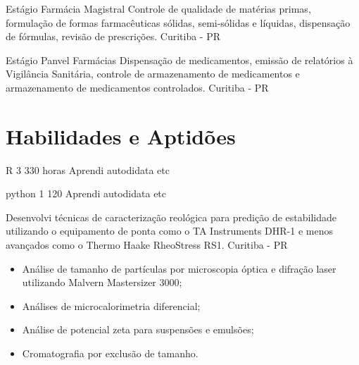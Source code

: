 {Estágio}
{Farmácia Magistral}
{
	Controle de qualidade de matérias primas, 
	formulação de formas farmacêuticas sólidas, 
	semi-sólidas e líquidas, dispensação de fórmulas, 
	revisão de prescrições.
}
{Curitiba - PR}

{Estágio}
{Panvel Farmácias}
{
	Dispensação de medicamentos, 
	emissão de relatórios à Vigilância Sanitária, 
	controle de armazenamento de medicamentos e 
	armazenamento de medicamentos controlados.
}
{Curitiba - PR}

\section{Habilidades e Aptidões}




\skill
{R}
{3}
{330 horas}
{Aprendi autodidata etc}
	
\skill
{python}
{1}
{120}
{Aprendi autodidata etc}
	




	{
	Desenvolvi técnicas de caracterização reológica para 
	predição de estabilidade utilizando o 
	equipamento de ponta como o TA Instruments DHR-1 e 
	menos avançados como o Thermo Haake RheoStress RS1.
	}{Curitiba - PR}







\renewcommand{\labelitemi}{\textendash}

{
	\begin{itemize}
	\item Análise de tamanho de partículas por microscopia óptica e difração laser utilizando Malvern Mastersizer 3000;
	\item Análises de microcalorimetria diferencial;
	\item Análise de potencial zeta para suspensões e emulsões;
	\item Cromatografia por exclusão de tamanho.
	\end{itemize}
	}{}


